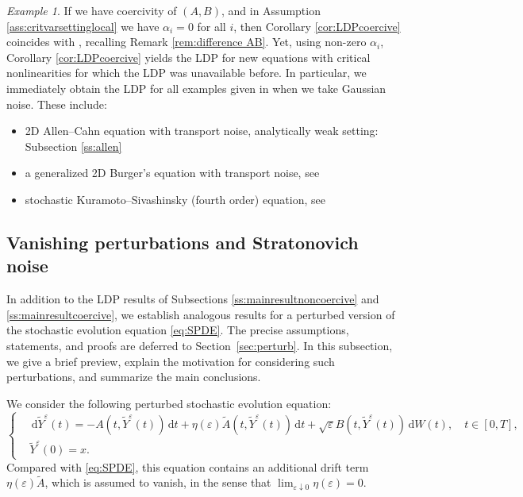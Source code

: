 \documentclass{amsart}
\newcommand{\dd}{\,\mathrm{d}}
\newcommand{\<}{\langle}
\newcommand{\?}{\rangle}
\theoremstyle{plain}
\theoremstyle{remark}
\newtheorem{example}[theorem]{Example}
\theoremstyle{plain}
\numberwithin{equation}{section}
\newcommand{\eps}{\varepsilon}
\begin{document}
\begin{example}\label{ex:applications hat F}
If we have coercivity of $(A,B)$, and in Assumption \ref{ass:critvarsettinglocal} we have $\alpha_i=0$ for all $i$, then Corollary \ref{cor:LDPcoercive} coincides with \cite[Th.\ 2.6]{TV24}, recalling Remark \ref{rem:difference AB}. 
Yet, using non-zero $\alpha_i$,   Corollary \ref{cor:LDPcoercive} yields the LDP for new equations with critical nonlinearities for which the LDP was unavailable before. 
In particular, we immediately obtain the LDP for all examples given in \cite[\S8]{BGV} when we take Gaussian noise. These include: 
    \begin{itemize}
 \item 2D Allen--Cahn equation with transport noise, analytically weak setting: Subsection \ref{ss:allen}
 \item a generalized 2D Burger's equation with transport noise, see \cite[Ex.\ 8.3]{BGV}
 \item stochastic Kuramoto–Sivashinsky (fourth order) equation, see \cite[\S8.3]{BGV}
 \end{itemize} 
 \end{example}
 

\subsection{Vanishing perturbations and Stratonovich noise}\label{ss:perturbed main results}

In addition to the LDP results of Subsections \ref{ss:mainresultnoncoercive} and \ref{ss:mainresultcoercive}, we establish analogous results for a perturbed version of the stochastic evolution equation \eqref{eq:SPDE}. The precise assumptions, statements, and proofs are 
deferred to Section~\ref{sec:perturb}. In this subsection, we give a brief preview, explain the motivation for considering such perturbations, and summarize the main conclusions.

We consider the following perturbed  stochastic evolution equation: 
\begin{equation}\label{eq:SPDE perturbed}
   \begin{cases}
  &\dd \tilde{Y}^\eps(t)=-A(t,\tilde{Y}^\eps(t))\dd t+\eta(\eps)\tilde{A}(t,\tilde{Y}^\eps(t))\dd t+\sqrt{\eps}B(t,\tilde{Y}^\eps(t))\dd W(t), \quad t\in[0,T], \\
  &\tilde{Y}^\eps(0)=x.
\end{cases}
\end{equation}  
Compared with \eqref{eq:SPDE}, this equation contains an additional drift term $\eta(\eps)\tilde{A}$,  which is assumed to vanish, in the sense that $\lim_{\eps\downarrow0}\eta(\eps)=0$.  
\end{document}
